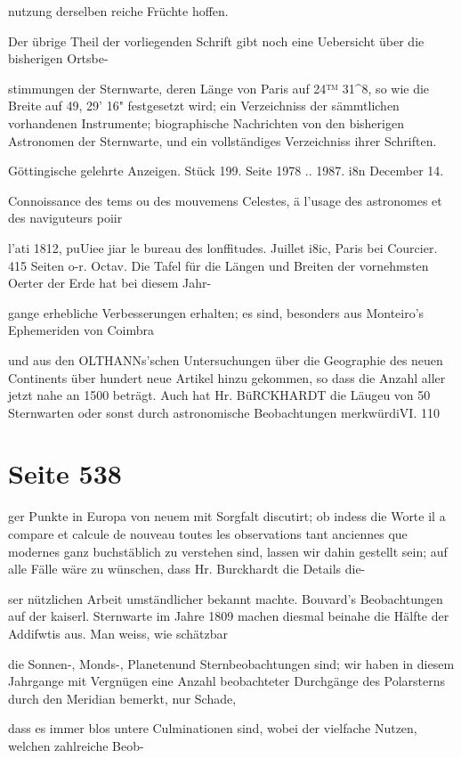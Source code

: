 \documentclass[10pt,a4paper]{article}
\begin{document}
nutzung derselben reiche Früchte hoffen.

Der übrige Theil der vorliegenden Schrift gibt noch eine Uebersicht über die bisherigen Ortsbe-

stimmungen der Sternwarte, deren Länge von Paris auf 24™ 31\textasciicircum{}8, so wie die Breite auf 49,\textdegree{} 29' 16" festgesetzt wird; ein Verzeichniss der sämmtlichen vorhandenen Instrumente; biographische Nachrichten von den bisherigen Astronomen der Sternwarte, und ein vollständiges Verzeichniss ihrer Schriften.

Göttingische gelehrte Anzeigen. Stück 199. Seite 1978 .. 1987. i8n December 14.

Connoissance des tems ou des mouvemens Celestes, ä l'usage des astronomes et des naviguteurs poiir

l'ati 1812, puUiee jiar le bureau des lonffitudes. Juillet i8ic, Paris bei Courcier. 415 Seiten o-r. Octav. Die Tafel für die Längen und Breiten der vornehmsten Oerter der Erde hat bei diesem Jahr-

gange erhebliche Verbesserungen erhalten; es sind, besonders aus Monteiro's Ephemeriden von Coimbra

und aus den OLTHANNs'schen Untersuchungen über die Geographie des neuen Continents über hundert neue Artikel hinzu gekommen, so dass die Anzahl aller jetzt nahe an 1500 beträgt. Auch hat Hr. BüRCKHARDT die Läugeu von 50 Sternwarten oder sonst durch astronomische Beobachtungen merkwürdiVI. 110


\newpage
\section*{Seite 538}
ger Punkte in Europa von neuem mit Sorgfalt discutirt; ob indess die Worte il a compare et calcule de nouveau toutes les observations tant anciennes que modernes ganz buchstäblich zu verstehen sind, lassen wir dahin gestellt sein; auf alle Fälle wäre zu wünschen, dass Hr. Burckhardt die Details die-

ser nützlichen Arbeit umständlicher bekannt machte. Bouvard's Beobachtungen auf der kaiserl. Sternwarte im Jahre 1809 machen diesmal beinahe die Hälfte der Addifwtis aus. Man weiss, wie schätzbar

die Sonnen-, Monds-, Planetenund Sternbeobachtungen sind; wir haben in diesem Jahrgange mit Vergnügen eine Anzahl beobachteter Durchgänge des Polarsterns durch den Meridian bemerkt, nur Schade,

dass es immer blos untere Culminationen sind, wobei der vielfache Nutzen, welchen zahlreiche Beob-
\end{document}
